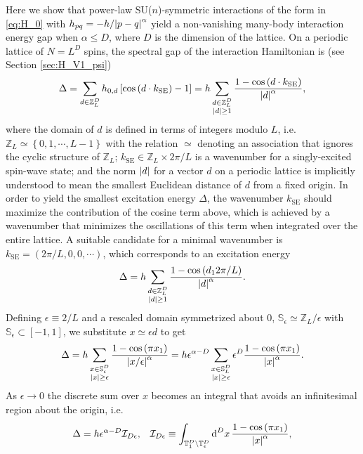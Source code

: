 \documentclass[nofootinbib,notitlepage,11pt]{revtex4-2}
\renewcommand{\t}{\text} %
\newcommand{\f}[2]{\dfrac{#1}{#2}} %
\newcommand{\p}[1]{\left(#1\right)} %
\renewcommand{\sp}[1]{\left[#1\right]} %
\renewcommand{\set}[1]{\left\{#1\right\}} %
\renewcommand{\c}{\cdot} %
\newcommand{\1}{\mathds{1}}
\renewcommand{\d}{\text{d}}
\newcommand{\I}{\mathcal{I}}
\renewcommand{\SS}{\mathbb{S}}
\newcommand{\TT}{\mathbb{T}}
\newcommand{\ZZ}{\mathbb{Z}}
\begin{document}
Here we show that power-law SU($n$)-symmetric interactions of the form
in \eqref{eq:H_0} with $h_{pq}=-h/\abs{p-q}^\alpha$ yield a
non-vanishing many-body interaction energy gap when $\alpha\le D$,
where $D$ is the dimension of the lattice.  On a periodic lattice of
$N=L^D$ spins, the spectral gap of the interaction Hamiltonian is (see
Section \ref{sec:H_V1_psi})
\begin{align}
  \Delta
  = \sum_{d\in\ZZ_L^D} h_{0,d} \sp{\cos\p{d \c k_{\t{SE}}}-1}
  = h \sum_{\substack{d\in\ZZ_L^D\\\abs{d}\ge1}}
  \f{1-\cos\p{d \c k_{\t{SE}}}}{\abs{d}^\alpha},
\end{align}
where the domain of $d$ is defined in terms of integers modulo $L$,
i.e.~$\ZZ_L\simeq\set{0,1,\cdots,L-1}$ with the relation $\simeq$
denoting an association that ignores the cyclic structure of $\ZZ_L$;
$k_{\t{SE}}\in\ZZ_L\times2\pi/L$ is a wavenumber for a singly-excited
spin-wave state; and the norm $\abs{d}$ for a vector $d$ on a periodic
lattice is implicitly understood to mean the smallest Euclidean
distance of $d$ from a fixed origin.  In order to yield the smallest
excitation energy $\Delta$, the wavenumber $k_{\t{SE}}$ should
maximize the contribution of the cosine term above, which is achieved
by a wavenumber that minimizes the oscillations of this term when
integrated over the entire lattice.  A suitable candidate for a
minimal wavenumber is $k_{\t{SE}}=\p{2\pi/L,0,0,\cdots}$, which
corresponds to an excitation energy
\begin{align}
  \Delta = h \sum_{\substack{d\in\ZZ_L^D\\\abs{d}\ge1}}
  \f{1-\cos\p{d_12\pi/L}}{\abs{d}^\alpha}.
\end{align}
Defining $\epsilon\equiv2/L$ and a rescaled domain symmetrized about
$0$, $\SS_\epsilon\simeq\ZZ_L/\epsilon$ with
$\SS_\epsilon\subset\sp{-1,1}$, we substitute $x\simeq\epsilon d$ to
get
\begin{align}
  \Delta
  = h \sum_{\substack{x\in\SS_\epsilon^D\\\abs{x}\ge\epsilon}}
  \f{1-\cos\p{\pi x_1}}{\abs{x/\epsilon}^\alpha}
  = h \epsilon^{\alpha-D} \sum_{\substack{x\in\SS_L^D\\\abs{x}\ge\epsilon}}
  \epsilon^D \f{1-\cos\p{\pi x_1}}{\abs{x}^\alpha}.
\end{align}
As $\epsilon\to0$ the discrete sum over $x$ becomes an integral that
avoids an infinitesimal region about the origin, i.e.
\begin{align}
  \Delta = h \epsilon^{\alpha-D} \I_{D\epsilon},
  &&
  \I_{D\epsilon}
  \equiv \int_{\TT_1^D\setminus\TT_\epsilon^D} \d^Dx\,
  \f{1-\cos\p{\pi x_1}}{\abs{x}^\alpha},
\end{align}
\end{document}
